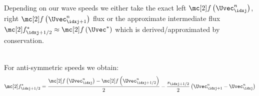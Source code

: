 \begin{explanationbox}\nospacing
    \begin{explanation}
        Depending on our wave speeds we either take the exact left $\flux\left(\Uvec_{\idxj}^{n}\right)$, right $\flux\left(\Uvec_{\idxj+1}^{n}\right)$ flux or the approximate intermediate flux $\flux^{*}_{\idxj+1/2}\approx\flux\left(\Uvec^{*}\right)$
        which is derived/approximated by conservation.\\
        \begin{minipage}[t]{0.32\textwidth}
            \begin{figure}[H]
                \centering{
                  \def\svgwidth{100pt}
                  \resizebox{\linewidth}{!}{
                    }
                }
            \end{figure}
        \end{minipage}
        \begin{minipage}[t]{0.32\textwidth}
            \begin{figure}[H]
                \centering{
                  \def\svgwidth{100pt}
                  \resizebox{\linewidth}{!}{
                    }
                }
            \end{figure}
        \end{minipage}
        \begin{minipage}[t]{0.32\textwidth}
            \begin{figure}[H]
                \centering{
                  \def\svgwidth{100pt}
                  \resizebox{\linewidth}{!}{
                    }
                }
            \end{figure}
        \end{minipage}
    \end{explanation}
\end{explanationbox}
\begin{corbox}\nospacing
    \begin{cor}[\hfill\tcblack{$-s^{l}_{\idxj+1/2}=s^{r}_{\idxj+1/2}=:s_{\idxj+1/2}$}\newline Symmetric Waves]\label{cor:symmetric_waves_non_linear_cystems}\leavevmode\\
        For anti-symmetric speeds we obtain:
        \begin{align}
          \flux^{*}_{\idxj+1/2}=\frac{\flux\left(\Uvec_{\idxj}^{n}\right)-\flux \left(\Uvec_{\idxj+1/2}^{n}\right)}{2}-\frac{s_{\idxj+1/2}}{2}\left(\Uvec_{\idxj+1}^{n}-\Uvec_{\idxj}^{n}\right)\label{eq:hll_symmetric_waves_systems}
        \end{align}
    \end{cor}
\end{corbox}
